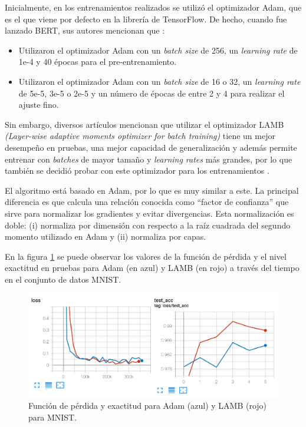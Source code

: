 Inicialmente, en los entrenamientos realizados se utilizó el optimizador Adam, que es el que viene por defecto en la librería de TensorFlow. De hecho, cuando fue lanzado BERT, sus autores mencionan que \citep{ARTICLE:8}:
\begin{itemize}
	\item Utilizaron el optimizador Adam con un \textit{batch size} de 256, un \textit{learning rate} de 1e-4 y 40 épocas para el pre-entrenamiento.
	\item Utilizaron el optimizador Adam con un \textit{batch size} de 16 o 32, un \textit{learning rate} de 5e-5, 3e-5 o 2e-5 y un número de épocas de entre 2 y 4 para realizar el ajuste fino.
\end{itemize}

Sin embargo, diversos artículos mencionan que utilizar el optimizador LAMB \textit{(Layer-wise adaptive moments optimizer for batch training)} tiene un mejor desempeño en pruebas, una mejor capacidad de generalización y además permite entrenar con \textit{batches} de mayor tamaño y \textit{learning rates} más grandes, por lo que también se decidió probar con este optimizador para los entrenamientos \citep{ARTICLE:9} \citep{WEBSITE:26}.

El algoritmo está basado en Adam, por lo que es muy similar a este. La principal diferencia es que calcula una relación conocida como ``factor de confianza'' que sirve para normalizar los gradientes y evitar divergencias. Esta normalización es doble: (i) normaliza por dimensión con respecto a la raíz cuadrada del segundo momento utilizado en Adam y (ii) normaliza por capas.

En la figura \ref{fig:cap3-lamb} se puede observar los valores de la función de pérdida y el nivel exactitud en pruebas para Adam (en azul) y LAMB (en rojo) a través del tiempo en el conjunto de datos MNIST.

\begin{figure}[htbp]
	\centering
	\includegraphics[width=.8\textwidth]{./Figures/cap3-adam-vs-lamb.png}
	\caption{Función de pérdida y exactitud para Adam (azul) y LAMB (rojo) para MNIST\protect\footnotemark.}
	\label{fig:cap3-lamb}
\end{figure}

